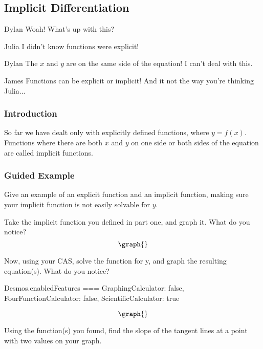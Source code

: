 \documentclass{ximera}
\begin{document}
\subsection{Implicit Differentiation}
\begin{dialogue}
\item[Dylan] Woah! What's up with this?
\item[Julia] I didn't know functions were explicit!
\item[Dylan] The $x$ and $y$ are on the same side of the equation! I can't deal with this.
\item[James] Functions can be explicit or implicit! And it not the way you're thinking Julia...
\end{dialogue}
\subsubsection{Introduction}
So far we have dealt only with explicitly defined functions, where $y=f(x)$.  Functions where there are both $x$ and $y$ on one side or both sides of the equation are called implicit functions.
\subsubsection{Guided Example}
\begin{question}
Give an example of an explicit function and an implicit function, making sure your implicit function is not easily solvable for $y$.
\begin{freeResponse}
\end{freeResponse}
\end{question}
\begin{question}
Take the implicit function you defined in part one, and graph it. What do you notice?
\[
\graph{}
\]
\begin{freeResponse}
\end{freeResponse}
\end{question}
Now, using your CAS, solve the function for y, and graph the resulting equation(s). What do you notice?
\begin{javascript}
Desmos.enabledFeatures === {
  GraphingCalculator: false,
  FourFunctionCalculator: false,
  ScientificCalculator: true
}
\end{javascript}
\[
\graph{}
\]


Using the function(s) you found, find the slope of the tangent lines at a point with two values on your graph.
\end{document}
